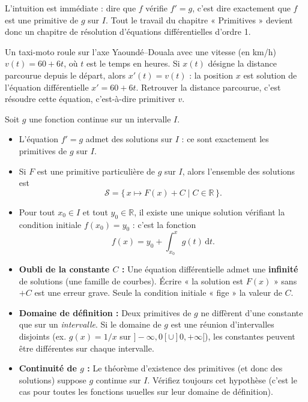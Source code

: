 \documentclass[11pt]{article}
\newcommand{\cle}[1]{{\popxbold\color{popdark}#1}}
\begin{document}
L'intuition est immédiate : dire que $f$ vérifie $f' = g$, c'est dire exactement que $f$ est une \cle{primitive} de $g$ sur $I$. Tout le travail du chapitre « Primitives » devient donc un chapitre de résolution d'équations différentielles d'ordre 1.

\begin{exemplebox}
Un taxi-moto roule sur l'axe Yaoundé--Douala avec une vitesse (en km/h) $v(t) = 60 + 6t$, où $t$ est le temps en heures. Si $x(t)$ désigne la distance parcourue depuis le départ, alors $x'(t) = v(t)$ : la position $x$ est solution de l'équation différentielle $x' = 60 + 6t$. Retrouver la distance parcourue, c'est résoudre cette équation, c'est-à-dire primitiver $v$.
\end{exemplebox}

\begin{propriete}[Ensemble des solutions de $f' = g$]
Soit $g$ une fonction continue sur un intervalle $I$.
\begin{itemize}
\item L'équation $f' = g$ admet des solutions sur $I$ : ce sont exactement les primitives de $g$ sur $I$.
\item Si $F$ est une primitive particulière de $g$ sur $I$, alors l'ensemble des solutions est
\[
\mathcal{S} = \{\, x \longmapsto F(x) + C \mid C \in \mathbb{R} \,\}.
\]
\item Pour tout $x_0 \in I$ et tout $y_0 \in \mathbb{R}$, il existe une \cle{unique} solution vérifiant la condition initiale $f(x_0) = y_0$ : c'est la fonction
\[
f(x) = y_0 + \int_{x_0}^{x} g(t)\,\mathrm{d}t.
\]
\end{itemize}
\end{propriete}

\begin{attention}
\begin{itemize}
\item \textbf{Oubli de la constante $C$ :} Une équation différentielle admet une \textbf{infinité} de solutions (une famille de courbes). Écrire « la solution est $F(x)$ » sans $+C$ est une erreur grave. Seule la condition initiale « fige » la valeur de $C$.
\item \textbf{Domaine de définition :} Deux primitives de $g$ ne diffèrent d'une constante que sur un \emph{intervalle}. Si le domaine de $g$ est une réunion d'intervalles disjoints (ex. $g(x) = 1/x$ sur $]-\infty,0[ \cup ]0,+\infty[$), les constantes peuvent être différentes sur chaque intervalle.
\item \textbf{Continuité de $g$ :} Le théorème d'existence des primitives (et donc des solutions) suppose $g$ continue sur $I$. Vérifiez toujours cet hypothèse (c'est le cas pour toutes les fonctions usuelles sur leur domaine de définition).
\end{itemize}
\end{attention}
\end{document}
